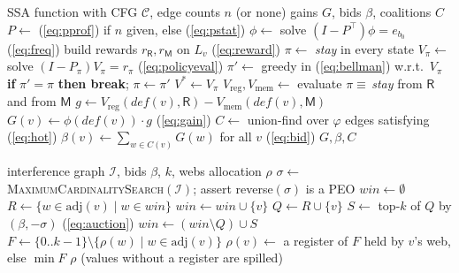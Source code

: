 \documentclass{ieeeaccess}
\newcommand{\Reg}{\mathsf{R}}
\newcommand{\Mem}{\mathsf{M}}
\begin{document}
\begin{algorithm}[t]
\caption{Profile-driven gains and coalition bids}
\label{alg:gains}
\begin{algorithmic}[1]
\REQUIRE SSA function with CFG $\mathcal{C}$, edge counts $n$ (or none)
\ENSURE gains $G$, bids $\beta$, coalitions $C$
\STATE $P \leftarrow$ (\ref{eq:pprof}) if $n$ given, else (\ref{eq:pstat})
\STATE $\phi \leftarrow$ solve $(I-P^\top)\phi=e_{b_0}$ \hfill (\ref{eq:freq})
  \STATE build rewards $r_\Reg, r_\Mem$ on $L_v$ \hfill (\ref{eq:reward})
  \STATE $\pi \leftarrow$ \emph{stay} in every state
  \REPEAT
    \STATE $V_\pi \leftarrow$ solve $(I-P_\pi)V_\pi=r_\pi$ \hfill (\ref{eq:policyeval})
    \STATE $\pi' \leftarrow$ greedy in (\ref{eq:bellman}) w.r.t.\ $V_\pi$
    \STATE \textbf{if} $\pi'=\pi$ \textbf{then break}; $\pi\leftarrow\pi'$
  \STATE $V^\ast\leftarrow V_\pi$ 
  \STATE $V_{\mathrm{reg}}, V_{\mathrm{mem}} \leftarrow$ evaluate $\pi\equiv$\,\emph{stay} from $\Reg$ and from $\Mem$
  \STATE $g\leftarrow V_{\mathrm{reg}}(\mathit{def}(v),\Reg)-V_{\mathrm{mem}}(\mathit{def}(v),\Mem)$
  \STATE $G(v)\leftarrow \phi(\mathit{def}(v))\cdot g$ \hfill (\ref{eq:gain})
\ENDFOR
\STATE $C \leftarrow$ union-find over $\varphi$ edges satisfying (\ref{eq:hot})
\STATE $\beta(v)\leftarrow\sum_{w\in C(v)}G(w)$ for all $v$ \hfill (\ref{eq:bid})
\RETURN $G,\beta,C$
\end{algorithmic}
\end{algorithm}

\begin{algorithm}[t]
\caption{MCS-ordered sealed-bid auction and register binding}
\label{alg:auction}
\begin{algorithmic}[1]
\REQUIRE interference graph $\mathcal{I}$, bids $\beta$, $k$, webs
\ENSURE allocation $\rho$
\STATE $\sigma\leftarrow$ \textsc{MaximumCardinalitySearch}$(\mathcal{I})$; assert reverse$(\sigma)$ is a PEO
\STATE $\mathit{win}\leftarrow\emptyset$
  \STATE $R\leftarrow\{w\in\mathrm{adj}(v)\mid w\in\mathit{win}\}$
    \STATE $\mathit{win}\leftarrow\mathit{win}\cup\{v\}$
  \ELSE
    \STATE $Q\leftarrow R\cup\{v\}$ 
    \STATE $S\leftarrow$ top-$k$ of $Q$ by $(\beta,-\sigma)$ \hfill (\ref{eq:auction})
    \STATE $\mathit{win}\leftarrow(\mathit{win}\setminus Q)\cup S$
  \ENDIF
\ENDFOR
{}
  \STATE $F\leftarrow\{0..k{-}1\}\setminus\{\rho(w)\mid w\in\mathrm{adj}(v)\}$
  \STATE $\rho(v)\leftarrow$ a register of $F$ held by $v$'s web, else $\min F$
\ENDFOR
\RETURN $\rho$ (values without a register are spilled)
\end{algorithmic}
\end{algorithm}
\end{document}
